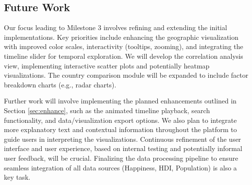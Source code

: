 \documentclass[10pt,conference,compsocconf]{IEEEtran}
\begin{document}
\subsection{Future Work} %
Our focus leading to Milestone 3 involves refining and extending the initial implementations. Key priorities include enhancing the geographic visualization with improved color scales, interactivity (tooltips, zooming), and integrating the timeline slider for temporal exploration. We will develop the correlation analysis view, implementing interactive scatter plots and potentially heatmap visualizations. The country comparison module will be expanded to include factor breakdown charts (e.g., radar charts).

Further work will involve implementing the planned enhancements outlined in Section \ref{sec:enhance}, such as the animated timeline playback, search functionality, and data/visualization export options. We also plan to integrate more explanatory text and contextual information throughout the platform to guide users in interpreting the visualizations. Continuous refinement of the user interface and user experience, based on internal testing and potentially informal user feedback, will be crucial. Finalizing the data processing pipeline to ensure seamless integration of all data sources (Happiness, HDI, Population) is also a key task.

\printbibliography %
\end{document}
